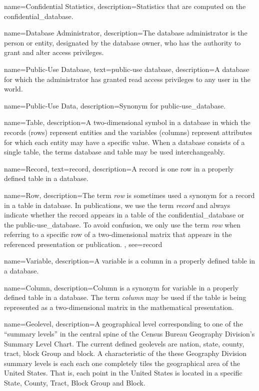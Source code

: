 {
    name=Confidential Statistics,
    description={Statistics that are computed on the \gls{confidential_database}.}
}

{
    name=Database Administrator,
    description={The database administrator is the person or entity, designated by the database owner, who has the authority to grant and alter access privileges.}
}

{
    name=Public-Use Database,
    text=public-use database,
    description={A \gls{database} for which the administrator has granted read access privileges to any user in the world.}
}

{
    name=Public-Use Data,
    description={Synonym for \gls{public-use_database}.}
}

{
    name=Table,
    description={A two-dimensional symbol in a database in which the \glspl{record} (rows) represent entities and the variables (columns) represent attributes for which each entity may have a specific value. When a database consists of a single table, the terms database and table may be used interchangeably.}
}

{
    name=Record,
    text=record,
    description={A record is one row in a properly defined table in a database.}
}

{
    name=Row,
    description={The term \textit{row} is sometimes used a synonym for a \gls{record} in a table in database. In publications, we  use the term \textit{record} and  always indicate whether the record appears in a table of the \gls{confidential_database} or the \gls{public-use_database}. To avoid confusion, we only use the term \textit{row} when referring to a specific row of a two-dimensional matrix that appears in the referenced presentation or publication. },
    see={record}
}

{
    name=Variable,
    description={A variable is a column in a properly defined table in a database.}
}

{
    name=Column,
    description={Column is a synonym for variable in a properly defined table in a database. The term \textit{column} may be used if the table is being represented as a two-dimensional matrix in the mathematical presentation.}
}

{
    name=Geolevel,
    description={A geographical level corresponding to one of the  ``summary levels'' in the central spine of the Census Bureau Geography Division's Summary Level Chart. The current defined geolevels are nation, state, county, tract, block Group and block. A characteristic of the these Geography Division summary levels is each each one completely tiles the geographical area of the United States. That is, each point in the United States is located in a specific State, County, Tract, Block Group and Block.}
}

